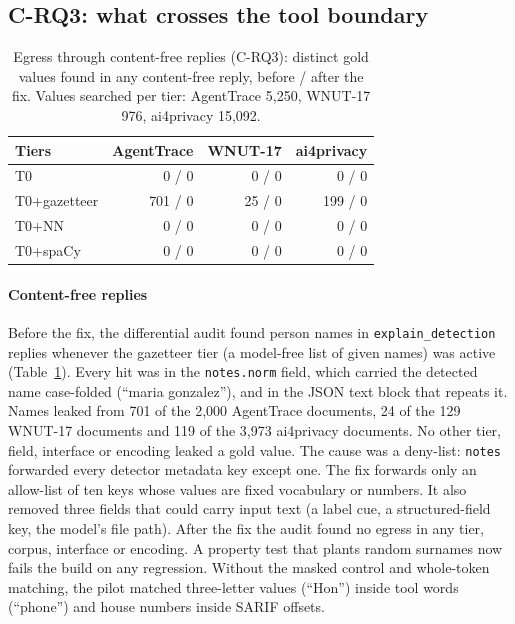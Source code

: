 \documentclass[conference]{IEEEtran}
\begin{document}
\subsection{C-RQ3: what crosses the tool boundary}\label{sec:egress}

\begin{table}[t]
\caption{Egress through content-free replies (C-RQ3): distinct gold values found in any content-free reply, before / after the fix. Values searched per tier: AgentTrace 5,250, WNUT-17 976, ai4privacy 15,092.}\label{tab:egress}
\centering\footnotesize
\begin{tabular}{@{}l r r r@{}}
\toprule
Tiers & AgentTrace & WNUT-17 & ai4privacy \\
\midrule
T0 & 0 / 0 & 0 / 0 & 0 / 0 \\
T0+gazetteer & 701 / 0 & 25 / 0 & 199 / 0 \\
T0+NN & 0 / 0 & 0 / 0 & 0 / 0 \\
T0+spaCy & 0 / 0 & 0 / 0 & 0 / 0 \\
\bottomrule
\end{tabular}
\end{table}


\paragraph{Content-free replies} Before the fix, the differential audit found person names in \texttt{explain\_\allowbreak detection} replies whenever the gazetteer tier (a model-free list of given names) was active (Table~\ref{tab:egress}). Every hit was in the \texttt{notes.norm} field, which carried the detected name case-folded (``maria gonzalez''), and in the JSON text block that repeats it. Names leaked from 701 of the 2,000 AgentTrace documents, 24 of the 129 WNUT-17 documents and 119 of the 3,973 ai4privacy documents. No other tier, field, interface or encoding leaked a gold value. The cause was a deny-list: \texttt{notes} forwarded every detector metadata key except one. The fix forwards only an allow-list of ten keys whose values are fixed vocabulary or numbers. It also removed three fields that could carry input text (a label cue, a structured-field key, the model's file path). After the fix the audit found no egress in any tier, corpus, interface or encoding. A property test that plants random surnames now fails the build on any regression. Without the masked control and whole-token matching, the pilot matched three-letter values (``Hon'') inside tool words (``phone'') and house numbers inside SARIF offsets.
\end{document}
